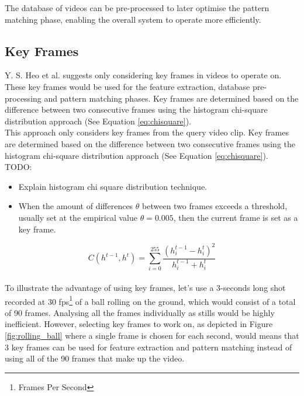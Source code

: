 \documentclass[11pt,openany,a4paper]{article}
\begin{document}
The database of videos can be pre-processed to later optimise the pattern matching phase, enabling the overall system to operate more efficiently.


\subsection{Key Frames}
\label{sec:key-frames}

Y. S. Heo et al. \cite{heo2016colortransfer} suggests only considering key frames in videos to operate on. These key frames would be used for the feature extraction, database pre-processing and pattern matching phases. Key frames are determined based on the difference between two consecutive frames using the histogram chi-square distribution approach (See Equation \ref{eq:chisquare}).\\

\cite{heo2016colortransfer}
This approach only considers key frames from the query video clip. Key frames are determined based on the difference between two consecutive frames using the histogram chi-square distribution approach (See Equation \ref{eq:chisquare}).\\

TODO:
\begin{itemize}
    \item Explain histogram chi square distribution technique.
    \item When the amount of differences $\theta$ between two frames exceeds a threshold, usually set at the empirical value $\theta = 0.005$, then the current frame is set as a key frame.
\end{itemize}

\begingroup \Large \begin{equation} \label{eq:chisquare}
    C(h^{t-1}, h^{t}) = \sum_{i=0}^{255} \frac{(h_{i}^{t-1} - h_{i}^{t})^2}{h_{i}^{t-1} + h_{i}^{t}}
\end{equation} \endgroup \\

To illustrate the advantage of using key frames, let's use a 3-seconds long shot recorded at 30 fps\footnote{Frames Per Second} of a ball rolling on the ground, which would consist of a total of 90 frames. Analysing all the frames individually as stills would be highly inefficient. However, selecting key frames to work on, as depicted in Figure \ref{fig:rolling_ball} where a single frame is chosen for each second, would means that 3 key frames can be used for feature extraction and pattern matching instead of using all of the 90 frames that make up the video.\\
\end{document}
